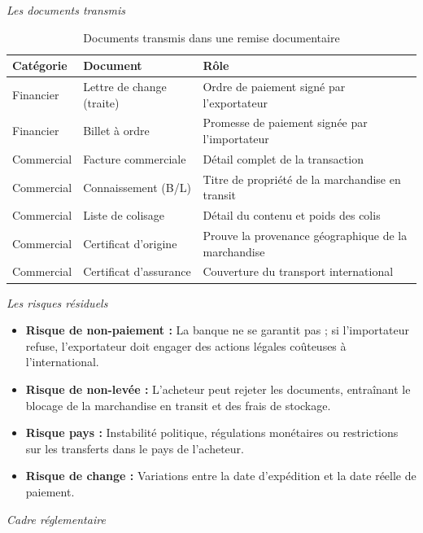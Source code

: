 \medskip\textit{Les documents transmis}

\begin{table}[h!]
\centering
\begin{tabularx}{\textwidth}{l l X}
\toprule
Catégorie & Document & Rôle \\
\midrule
Financier & Lettre de change (traite) & Ordre de paiement signé par l'exportateur \\
Financier & Billet à ordre & Promesse de paiement signée par l'importateur \\
Commercial & Facture commerciale & Détail complet de la transaction \\
Commercial & Connaissement (B/L) & Titre de propriété de la marchandise en transit \\
Commercial & Liste de colisage & Détail du contenu et poids des colis \\
Commercial & Certificat d'origine & Prouve la provenance géographique de la marchandise \\
Commercial & Certificat d'assurance & Couverture du transport international \\
\bottomrule
\end{tabularx}
\caption{Documents transmis dans une remise documentaire}
\end{table}

\medskip\textit{Les risques résiduels}

\begin{itemize}
  \item \textbf{Risque de non-paiement :} La banque ne se garantit pas ; si l'importateur refuse, l'exportateur doit engager des actions légales coûteuses à l'international.
  \item \textbf{Risque de non-levée :} L'acheteur peut rejeter les documents, entraînant le blocage de la marchandise en transit et des frais de stockage.
  \item \textbf{Risque pays :} Instabilité politique, régulations monétaires ou restrictions sur les transferts dans le pays de l'acheteur.
  \item \textbf{Risque de change :} Variations entre la date d'expédition et la date réelle de paiement.
\end{itemize}

\medskip\textit{Cadre réglementaire}

